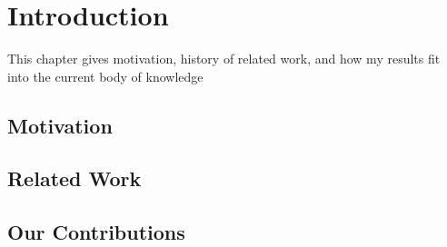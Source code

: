 \chapter{Introduction}
This chapter gives motivation, history of related work, and how my results fit into the current body of knowledge


\section{Motivation}

\section{Related Work}

\section{Our Contributions}
